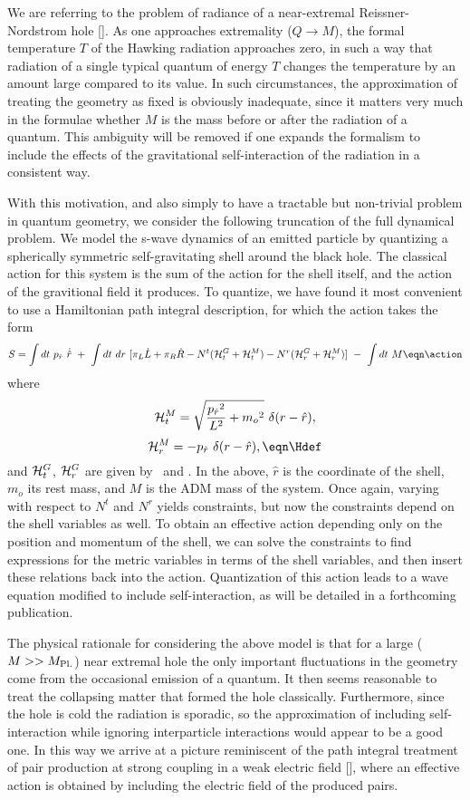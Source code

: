 We are referring to the problem of
radiance of a near-extremal Reissner-Nordstrom hole [\psstw ].
As one approaches extremality ($Q \rightarrow M$),
the formal temperature $T$ of the Hawking radiation approaches
zero, in such a way that radiation of a single typical
quantum of energy $T$ changes the temperature by an amount large
compared to its value.  In such circumstances, the approximation
of treating the geometry as fixed is obviously inadequate, since
it matters very much in the formulae whether $M$ is the mass
before or after the radiation of a quantum.
This ambiguity will be removed if one expands the formalism to
include the effects of the gravitational self-interaction of
the radiation in a consistent way.

With this motivation, and also simply to have a
tractable but non-trivial problem in quantum geometry,
we consider the following truncation of the full dynamical
problem.  We model the s-wave dynamics of an emitted particle by quantizing a
spherically symmetric self-gravitating shell around the black hole.  The
classical action for this system is the sum of the action for the shell itself,
and the action of the gravitional field it produces.  To quantize, we have
found it most convenient to use a Hamiltonian path integral description, for
which the action takes the form
$$
S = \int dt~ p_{\hat{r}}~ \dot{\hat{r}}~+~\int dt~dr~[\pi_{L}\dot{L} +
\pi_{R}\dot{R} - N^t ({\cal H}^G_t + {\cal H}^M_t) - N^r({\cal H}^G_r+
{\cal H}^M_r)] ~-~\int dt~ M
\eqn\action
$$
where
$$
{\cal H}^M_t = \sqrt{{{p_{\hat{r}}}^2 \over L^2} + {m_o}^2}~\delta(r-\hat{r}),
$$
$$
{\cal H}^M_r = - p_{\hat{r}}~\delta(r-\hat{r}),
\eqn\Hdef
$$
and ${\cal H}^G_t$, ${\cal H}^G_r$ are given by \lapseconstraint\  and
\shiftconstraint.
In the above, $\hat{r}$ is the coordinate of the shell, $m_o$ its rest mass,
and $M$ is the ADM mass of the system.  Once again, varying with respect to
$N^t$ and $N^r$ yields constraints, but now the constraints depend on the
shell variables as well. To obtain an effective action depending only on the
position and momentum of the shell, we can solve the constraints to find
expressions for the metric variables in terms of the shell variables, and then
insert these relations back into the action.  Quantization of this action
leads to a wave equation modified to include self-interaction, as will be
detailed in a forthcoming publication.

   The physical rationale for considering the above model is that for a large
($M>>M_{\rm Pl.}$) near extremal hole the only important fluctuations in the
geometry come from the occasional emission of a quantum.  It then seems
reasonable to treat the collapsing matter that formed the hole classically.
Furthermore, since the hole is cold the radiation is sporadic, so the
approximation of including self-interaction
while ignoring interparticle interactions would appear to be a good
one. In this way we arrive at a picture reminiscent of the path integral
treatment of pair production at strong coupling in a weak electric field
[\affleck ], where an effective action is obtained by including the
electric field of the produced pairs.

